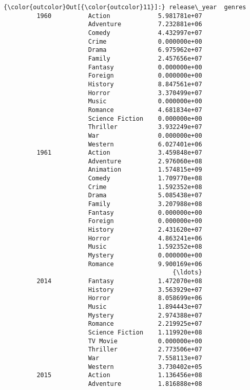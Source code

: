 \documentclass[11pt]{article}
\begin{document}
\begin{Verbatim}[commandchars=\\\{\}]
{\color{outcolor}Out[{\color{outcolor}11}]:} release\_year  genres         
         1960          Action             5.981781e+07
                       Adventure          7.232881e+06
                       Comedy             4.432997e+07
                       Crime              0.000000e+00
                       Drama              6.975962e+07
                       Family             2.457656e+07
                       Fantasy            0.000000e+00
                       Foreign            0.000000e+00
                       History            8.847561e+07
                       Horror             3.370499e+07
                       Music              0.000000e+00
                       Romance            4.681834e+07
                       Science Fiction    0.000000e+00
                       Thriller           3.932249e+07
                       War                0.000000e+00
                       Western            6.027401e+06
         1961          Action             3.459848e+07
                       Adventure          2.976060e+08
                       Animation          1.574815e+09
                       Comedy             1.709770e+08
                       Crime              1.592352e+08
                       Drama              5.085438e+07
                       Family             3.207988e+08
                       Fantasy            0.000000e+00
                       Foreign            0.000000e+00
                       History            2.431620e+07
                       Horror             4.863241e+06
                       Music              1.592352e+08
                       Mystery            0.000000e+00
                       Romance            9.900169e+06
                                              {\ldots}     
         2014          Fantasy            1.472070e+08
                       History            3.563929e+07
                       Horror             8.058699e+06
                       Music              1.894443e+07
                       Mystery            2.974388e+07
                       Romance            2.219925e+07
                       Science Fiction    1.119920e+08
                       TV Movie           0.000000e+00
                       Thriller           2.773506e+07
                       War                7.558113e+07
                       Western            3.730402e+05
         2015          Action             1.136456e+08
                       Adventure          1.816888e+08

\end{Verbatim}
\end{document}

